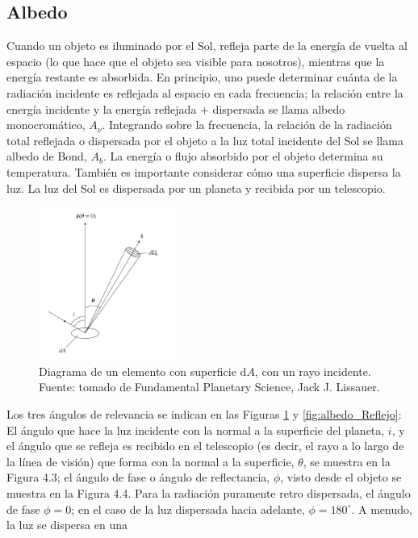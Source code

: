 \documentclass[12pt]{article}
\begin{document}
\subsection{Albedo}
Cuando un objeto es iluminado por el Sol, refleja parte de la energía de vuelta al espacio (lo que hace
que el objeto sea visible para nosotros), mientras que la energía restante es absorbida. En principio, uno 
puede determinar cuánta de la radiación incidente es reflejada al espacio en cada frecuencia; la relación entre 
la energía incidente y la energía reflejada + dispersada se llama albedo monocromático, $A_\nu$. 
Integrando sobre la frecuencia, la relación de la radiación total reflejada o dispersada por el objeto a la 
luz total incidente del Sol se llama albedo de Bond, $A_b$. La energía o flujo absorbido por el objeto determina
su temperatura. También es importante considerar cómo una superficie dispersa la luz. La luz del Sol es dispersada por
un planeta y recibida por un telescopio.\\
\begin{figure}[H]
    \centering
    \includegraphics[width=0.4\textwidth]{images/diagrama_albedo.png}
    \caption{Diagrama de un elemento con superficie $\mathrm{d}A$, con un rayo incidente. 
    Fuente: tomado de Fundamental Planetary Science, Jack J. Lissauer.}
    \label{fig:diagrama_albedo}
\end{figure}
Los tres ángulos de relevancia se indican en las Figuras \ref{fig:diagrama_albedo} y
\ref{fig:albedo_Reflejo}: El ángulo que hace la luz incidente con la normal a la superficie del planeta, $i$, y 
el ángulo que
se refleja es recibido en el telescopio (es decir, el rayo a lo largo de la línea de visión) que forma con la 
normal a la superficie, $\theta$, se muestra en la Figura 4.3; el ángulo de fase o ángulo de reflectancia, $\phi$, 
visto desde el objeto se muestra en la Figura 4.4. Para la radiación puramente retro dispersada, el ángulo de fase 
$\phi = 0$; en el caso de la luz dispersada hacia adelante, $\phi = 180^\circ$. A menudo, la luz se dispersa en una 
\end{document}
